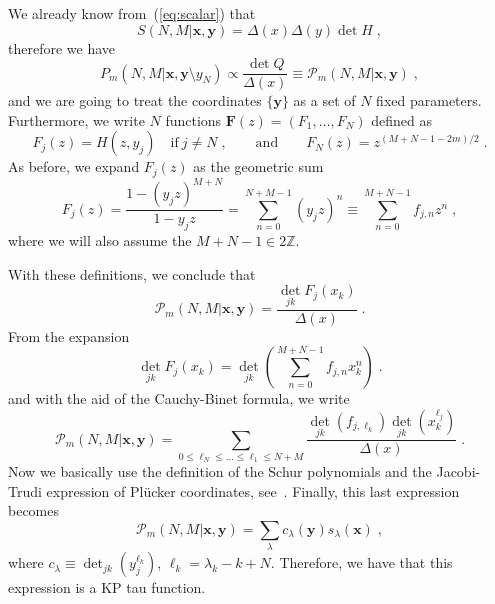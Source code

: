 \documentclass[a4paper,11pt]{amsart}
\begin{document}
We already know from~(\ref{eq:scalar}) that 
\begin{equation}
   S(N,M|\bm{x}, \bm{y}) =  \Delta(x) \Delta(y) \det H \; ,
\end{equation}
therefore we have
\begin{equation}
  P_m(N, M|\bm{x}, \bm{y}\setminus{y_N})  \propto
  \frac{\det Q}{\Delta(x)} \equiv \mathcal{P}_m(N,M|\bm{x}, \bm{y})\; ,
\end{equation}
and we are going to treat the coordinates \(\{ \bm{y} \}\) as
a set of \(N\) fixed parameters. Furthermore, we write \(N\)
functions \(\bm{F}(z) = (F_1, \dots, F_N)\) defined as
\begin{equation}
  F_j (z) = H(z, y_j) \quad \textrm{if} \ j \neq N\; , \qquad \textrm{and}\qquad 
   F_N (z)  = z^{(M + N - 1 - 2m)/2} \; .
\end{equation}
As before, we expand \(F_j(z)\) as the geometric sum
\begin{equation}
  F_j(z) = \frac{1 - (y_j z)^{M + N}}{1 - y_j z} = \sum_{n=0}^{N + M - 1} (y_j z)^n
  \equiv \sum_{n=0}^{M + N -1} f_{j, n} z^n\; , 
\end{equation}
where we will also assume the \(M + N - 1 \in 2 \mathbb{Z}\).

With these definitions, we conclude that
\begin{equation}
\mathcal{P}_m(N,M|\bm{x}, \bm{y}) =\frac{\det_{jk} F_j(x_k)}{\Delta(x)}\; .
\end{equation}
From the expansion 
\begin{equation}
  \det_{jk} F_j(x_k) = \det_{jk} \left(  \sum_{n=0}^{M + N -1} f_{j, n} x_k^n \right) \; .
\end{equation}
and with the aid of the Cauchy-Binet formula, we write  
\begin{equation}
    \mathcal{P}_m(N,M|\bm{x}, \bm{y})
  = \sum_{0\leq \ell_N\leq \dots \leq \ell_1 \leq N+M}
  \frac{\det_{jk}(f_{j, \ell_k}) \det_{jk}(x_k^{\ell_j})}{\Delta(x)}\; . 
\end{equation}
Now we basically use the definition of the Schur polynomials and the
Jacobi-Trudi expression of Plücker coordinates, see~\cite{Alexandrov:2012tr}. 
Finally, this last expression becomes
\begin{equation}
\mathcal{P}_m(N,M|\bm{x}, \bm{y}) =
\sum_{\lambda} c_\lambda(\bm{y}) s_\lambda(\bm{x}) \; ,
\end{equation}
where \(c_\lambda \equiv \det_{jk}(y_j^{\ell_k})\),  \(\ell_k = \lambda_k - k +N\). Therefore,
we have that this expression is a KP tau function. 
\end{document}
